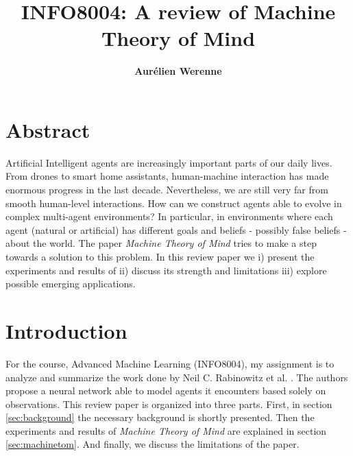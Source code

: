 \documentclass[twocolumn,superscriptaddress,aps]{revtex4-1}
\begin{document}

\title{\Large{INFO8004: A review of Machine Theory of Mind}}
\vspace{1cm}
\author{\small{\bf Aurélien Werenne}}

\maketitle



\section*{Abstract}
\begin{changemargin}{0.55cm}{0.55cm} 
Artificial Intelligent agents are increasingly important parts of our daily lives. From drones to smart home assistants, human-machine interaction has made enormous progress in the last decade. Nevertheless, we are still very far from smooth human-level interactions. How can we construct agents able to evolve in complex multi-agent environments? In particular, in environments where each agent (natural or artificial) has different goals and beliefs - possibly false beliefs - about the world. The paper \textit{Machine Theory of Mind} \cite{Tomnet} tries to make a step towards a solution to this problem. In this review paper we i) present the experiments and results of \cite{Tomnet} ii) discuss its strength and limitations iii) explore possible emerging applications.
\end{changemargin} 

\section{Introduction}

\noindent For the course, Advanced Machine Learning (INFO8004), my assignment is to analyze and summarize the work done by Neil C. Rabinowitz et al. \cite{Tomnet}. The authors propose a neural network able to model agents it encounters based solely on observations. This review paper is organized into three parts. First, in section \ref{sec:background} the necessary background is shortly presented. Then the experiments and results of \textit{Machine Theory of Mind} are explained in section \ref{sec:machinetom}. And finally, we discuss the limitations of the paper.
\end{document}
